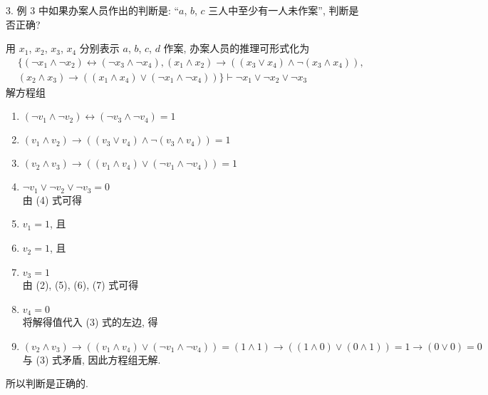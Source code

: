 \documentclass[boxes]{homework}
\begin{document}
\begin{problem}
    3. 例 3 中如果办案人员作出的判断是: ``$a$, $b$, $c$ 三人中至少有一人未作案'', 判断是否正确?
\end{problem}
\begin{solution}
    用 $x_1$, $x_2$, $x_3$, $x_4$ 分别表示 $a$, $b$, $c$, $d$ 作案, 办案人员的推理可形式化为
    \begin{align*}
        &\{(\lnot x_1\land\lnot x_2)\leftrightarrow(\lnot x_3\land \lnot x_4), (x_1\land x_2)\to ((x_3\lor x_4)\land \lnot(x_3\land x_4)), \\
        &(x_2\land x_3)\to ((x_1\land x_4)\lor (\lnot x_1\land \lnot x_4))\}\vdash \lnot x_1\lor\lnot x_2\lor \lnot x_3
    \end{align*}
    解方程组
    \begin{enumerate}[label = (\arabic*), parsep = 0pt, itemsep = 0pt, topsep = .25em]
        \item $(\lnot v_1\land\lnot v_2)\leftrightarrow(\lnot v_3\land \lnot v_4)=1$
        \item $(v_1\land v_2)\to ((v_3\lor v_4)\land \lnot(v_3\land v_4))=1$
        \item $(v_2\land v_3)\to ((v_1\land v_4)\lor (\lnot v_1\land \lnot v_4))=1$
        \item $\lnot v_1\lor\lnot v_2\lor \lnot v_3=0$\\
        由 (4) 式可得
        \item $v_1=1$, 且
        \item $v_2=1$, 且
        \item $v_3=1$\\
        由 (2), (5), (6), (7) 式可得
        \item $v_4 = 0$\\
        将解得值代入 (3) 式的左边, 得
        \item $(v_2\land v_3)\to ((v_1\land v_4)\lor (\lnot v_1\land \lnot v_4))=(1\land 1)\to ((1\land 0)\lor (0\land 1)) = 1\to (0\lor 0) = 0$\\
        与 (3) 式矛盾, 因此方程组无解.
    \end{enumerate}
    所以判断是正确的.
\end{solution}
\end{document}
